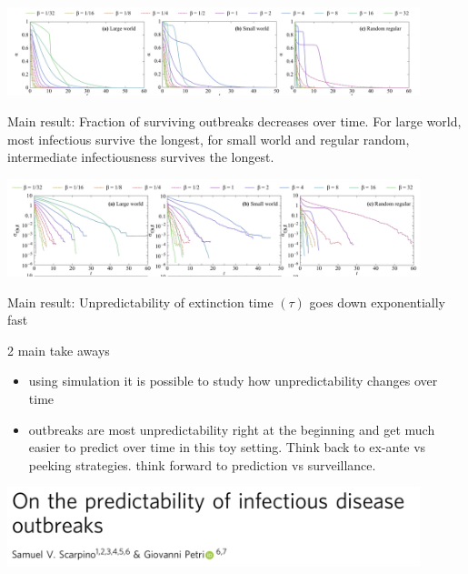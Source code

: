 \documentclass[aspectratio=169]{beamer}
\begin{document}
\begin{frame}

\begin{center}
\includegraphics[width = 0.9\textwidth]{figures/holme_time_2015_fig4_toprow}
\end{center}

\vfill
Main result: Fraction of surviving outbreaks decreases over time. For large world, most infectious survive the longest, for small world and regular random, intermediate infectiousness survives the longest.
\end{frame}
\begin{frame}

\begin{center}
\includegraphics[width = 0.9\textwidth]{figures/holme_time_2015_fig7_toprow}
\end{center}

\vfill
Main result: Unpredictability of extinction time $(\tau)$ goes down exponentially fast
\end{frame}
\begin{frame}

2 main take aways
\begin{itemize}
\item using simulation it is possible to study how unpredictability changes over time
\pause
\item outbreaks are most unpredictability right at the beginning and get much easier to predict over time in this toy setting. Think back to ex-ante vs peeking strategies. think forward to prediction vs surveillance. 
\end{itemize}

\end{frame}
\begin{frame}

\begin{center}
\includegraphics[width = 0.9\textwidth]{figures/scarpino_on_2019_title}
\end{center}

\end{frame}
\end{document}
